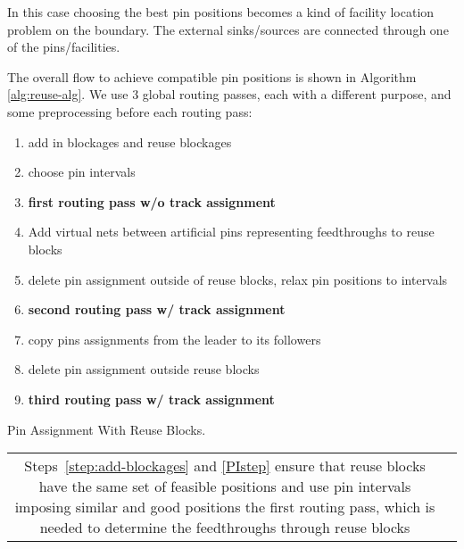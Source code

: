 \documentclass[a2paper]{bigsposter}
\begin{document}
\begin{blockrow}
In this case choosing the best pin positions becomes a kind of facility location problem on the boundary.
The external sinks/sources are connected through one of the pins/facilities.


\blockbreak
{}
The overall flow to achieve compatible pin positions is shown in Algorithm \ref{alg:reuse-alg}.
We use 3 global routing passes, each with a different purpose, and some preprocessing before each routing pass:
\begin{algorithm}[H] 
	\begin{enumerate}
		\item add in blockages and reuse blockages \label{step:add-blockages}
		\item choose pin intervals  \label{PIstep}
		\item \textbf{first routing pass w/o track assignment} \label{step:pass1}
		\item Add virtual nets between artificial pins representing feedthroughs to reuse blocks \label{step:create-artificial-feedthroughs}
		\item delete pin assignment outside of reuse blocks, relax pin positions to intervals \label{step:relaxpositions}
		\item \textbf{second routing pass w/ track assignment}
		\item copy pins assignments from the leader to its followers \label{step:copy-pin-assignment}
		\item delete pin assignment outside reuse blocks
		\item \textbf{third routing pass w/ track assignment}
	\end{enumerate} %
	\caption{Pin Assignment With Reuse Blocks.}
	\label{alg:reuse-alg}
\end{algorithm}
\begin{tabular}{cc}
	\begin{minipage}{0.5\blockwidth}
	

		  Steps~\ref{step:add-blockages} and \ref{PIstep} ensure that reuse blocks have the same set of feasible positions and use pin intervals imposing  similar and good  positions the first routing pass, which is needed to determine the feedthroughs through reuse blocks
		   	\end{minipage}    &\begin{minipage}{0.49\blockwidth}
		  \centering\begin{tikzpicture}
	\def\nrows{4}
	\def\ncols{3}
	\def\rowheightu{0.7}
	\def\rowheightl{1.2}
	\def\corridorwidth{0.2}
	\def\reusewidth{2.0}
	\def\otherwidth{1.0}
	\def\uppersmallwidth{1.5}
	\def\sinkscale{0.3}
	\def\rootscale{0.4}
	

\end{tikzpicture}
\end{minipage}
\end{tabular}
\end{blockrow}
\end{document}

